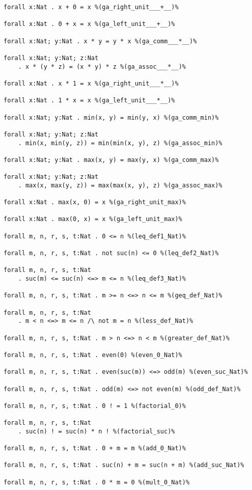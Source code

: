 \documentclass[11pt,a4paper]{article}
\begin{document}
\begin{verbatim}
forall x:Nat . x + 0 = x %(ga_right_unit___+__)%

forall x:Nat . 0 + x = x %(ga_left_unit___+__)%

forall x:Nat; y:Nat . x * y = y * x %(ga_comm___*__)%

forall x:Nat; y:Nat; z:Nat
    . x * (y * z) = (x * y) * z %(ga_assoc___*__)%

forall x:Nat . x * 1 = x %(ga_right_unit___*__)%

forall x:Nat . 1 * x = x %(ga_left_unit___*__)%

forall x:Nat; y:Nat . min(x, y) = min(y, x) %(ga_comm_min)%

forall x:Nat; y:Nat; z:Nat
    . min(x, min(y, z)) = min(min(x, y), z) %(ga_assoc_min)%

forall x:Nat; y:Nat . max(x, y) = max(y, x) %(ga_comm_max)%

forall x:Nat; y:Nat; z:Nat
    . max(x, max(y, z)) = max(max(x, y), z) %(ga_assoc_max)%

forall x:Nat . max(x, 0) = x %(ga_right_unit_max)%

forall x:Nat . max(0, x) = x %(ga_left_unit_max)%

forall m, n, r, s, t:Nat . 0 <= n %(leq_def1_Nat)%

forall m, n, r, s, t:Nat . not suc(n) <= 0 %(leq_def2_Nat)%

forall m, n, r, s, t:Nat
    . suc(m) <= suc(n) <=> m <= n %(leq_def3_Nat)%

forall m, n, r, s, t:Nat . m >= n <=> n <= m %(geq_def_Nat)%

forall m, n, r, s, t:Nat
    . m < n <=> m <= n /\ not m = n %(less_def_Nat)%

forall m, n, r, s, t:Nat . m > n <=> n < m %(greater_def_Nat)%

forall m, n, r, s, t:Nat . even(0) %(even_0_Nat)%

forall m, n, r, s, t:Nat . even(suc(m)) <=> odd(m) %(even_suc_Nat)%

forall m, n, r, s, t:Nat . odd(m) <=> not even(m) %(odd_def_Nat)%

forall m, n, r, s, t:Nat . 0 ! = 1 %(factorial_0)%

forall m, n, r, s, t:Nat
    . suc(n) ! = suc(n) * n ! %(factorial_suc)%

forall m, n, r, s, t:Nat . 0 + m = m %(add_0_Nat)%

forall m, n, r, s, t:Nat . suc(n) + m = suc(n + m) %(add_suc_Nat)%

forall m, n, r, s, t:Nat . 0 * m = 0 %(mult_0_Nat)%


\end{verbatim}
\end{document}
